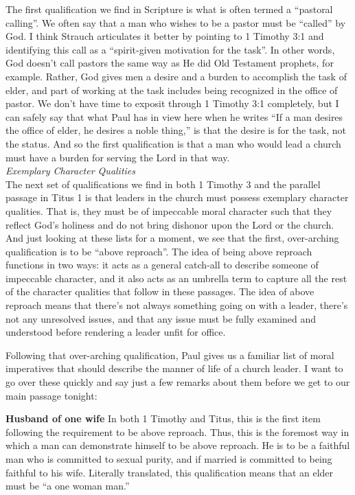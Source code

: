 \documentclass[letterpaper, 12pt]{article}
\begin{document}
    The first qualification we find in Scripture is what is often termed
    a ``pastoral calling''. We often say that a man who wishes to be a
    pastor must be ``called'' by God. I think Strauch articulates it
    better by pointing to 1 Timothy 3:1 and identifying this call as a
    ``spirit-given motivation for the task''. In other words, God
    doesn't call pastors the same way as He did Old Testament prophets,
    for example. Rather, God gives men a desire and a burden to
    accomplish the task of elder, and part of working at the task
    includes being recognized in the office of pastor. We don't have
    time to exposit through 1 Timothy 3:1 completely, but I can safely
    say that what Paul has in view here when he writes ``If a man
    desires the office of elder, he desires a noble thing,'' is that the
    desire is for the task, not the status. And so the first
    qualification is that a man who would lead a church must have a
    burden for serving the Lord in that way. \\

    \noindent \emph{Exemplary Character Qualities} \\

    The next set of qualifications we find in both 1 Timothy 3 and the
    parallel passage in Titus 1 is that leaders in the church must
    possess exemplary character qualities. That is, they must be of
    impeccable moral character such that they reflect God's holiness and
    do not bring dishonor upon the Lord or the church. And just looking
    at these lists for a moment, we see that the first, over-arching
    qualification is to be ``above reproach''. The idea of being above
    reproach functions in two ways: it acts as a general catch-all to
    describe someone of impeccable character, and it also acts as an
    umbrella term to capture all the rest of the character qualities
    that follow in these passages. The idea of above reproach means that
    there's not always something going on with a leader, there's not
    any unresolved issues, and that any issue must be fully examined and
    understood before rendering a leader unfit for office.

    Following that over-arching qualification, Paul gives us a familiar
    list of moral imperatives that should describe the manner of life of
    a church leader. I want to go over these quickly and say just a few
    remarks about them before we get to our main passage tonight:

    \textbf{Husband of one wife} In both 1 Timothy and Titus, this
    is the first item following the requirement to be above
    reproach.  Thus, this is the foremost way in which a man can
    demonstrate himself to be above reproach.  He is to be a
    faithful man who is committed to sexual purity, and if married
    is committed to being faithful to his wife.  Literally
    translated, this qualification means that an elder must be ``a
    one woman man.''
\end{document}
